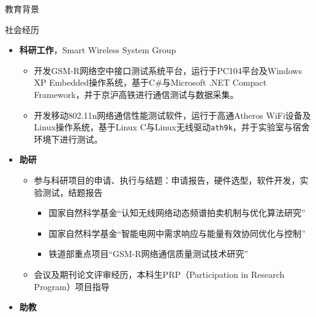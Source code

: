 
\begin{resume}

\begin{resumesection}{教育背景}
\end{resumesection}

\begin{resumesection}{社会经历}
\begin{itemize}
\item \textbf{科研工作}，Smart Wireless System Group
  \begin{itemize}
    \item 开发GSM-R网络空中接口测试系统平台，运行于PC104平台及Windows XP Embedded操作系统，基于C\#与Microsoft .NET Compact Framework，并于京沪高铁进行通信测试与数据采集。
    \item 开发移动802.11n网络通信性能测试软件，运行于高通Atheros WiFi设备及Linux操作系统，基于Linux C与Linux无线驱动\texttt{ath9k}，并于实验室与宿舍环境下进行测试。
  \end{itemize}
\item \textbf{助研}
  \begin{itemize}
    \item 参与科研项目的申请、执行与结题：申请报告，硬件选型，软件开发，实验测试，结题报告
    \begin{itemize}
      \item 国家自然科学基金“认知无线网络动态频谱拍卖机制与优化算法研究”
      \item 国家自然科学基金“智能电网中需求响应与能量有效协同优化与控制”
      \item 铁道部重点项目“GSM-R网络通信质量测试技术研究”
    \end{itemize}
    \item 会议及期刊论文评审经历，本科生PRP（Participation in Research Program）项目指导
  \end{itemize}
\item \textbf{助教}

\end{itemize}
\end{resumesection}
\end{resume}
